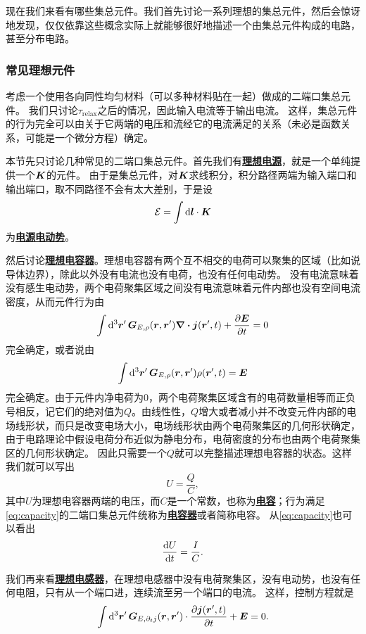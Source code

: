 \documentclass[UTF8, a4paper]{ctexart}
\newcommand*{\concept}[1]{\underline{\textbf{#1}}}
\begin{document}
现在我们来看有哪些集总元件。我们首先讨论一系列理想的集总元件，然后会惊讶地发现，仅仅依靠这些概念实际上就能够很好地描述一个由集总元件构成的电路，甚至分布电路。

\subsubsection{常见理想元件}


考虑一个使用各向同性均匀材料（可以多种材料贴在一起）做成的二端口集总元件。
我们只讨论$\tau_\text{relax}$之后的情况，因此输入电流等于输出电流。
这样，集总元件的行为完全可以由关于它两端的电压和流经它的电流满足的关系（未必是函数关系，可能是一个微分方程）确定。

本节先只讨论几种常见的二端口集总元件。首先我们有\concept{理想电源}，就是一个单纯提供一个$\vb*{K}$的元件。
由于是集总元件，对$\vb*{K}$求线积分，积分路径两端为输入端口和输出端口，取不同路径不会有太大差别，于是设
\begin{equation}
    \mathcal{E} = \int \dd{\vb*{l}} \cdot \vb*{K}
\end{equation}
为\concept{电源电动势}。

然后讨论\concept{理想电容器}。理想电容器有两个互不相交的电荷可以聚集的区域（比如说导体边界），除此以外没有电流也没有电荷，也没有任何电动势。
没有电流意味着没有感生电动势，两个电荷聚集区域之间没有电流意味着元件内部也没有空间电流密度，从而元件行为由
\[
    \int \dd[3]{\vb*{r}'} \vb*{G}_{E, \rho}(\vb*{r}, \vb*{r}') \div{\vb*{j}}(\vb*{r}', t) + \pdv{\vb*{E}}{t} = 0
\]
完全确定，或者说由
\[
    \int \dd[3]{\vb*{r}'} \vb*{G}_{E, \rho}(\vb*{r}, \vb*{r}') \rho(\vb*{r}', t) = \vb*{E}
\]
完全确定。由于元件内净电荷为0，两个电荷聚集区域含有的电荷数量相等而正负号相反，记它们的绝对值为$Q$。由线性性，$Q$增大或者减小并不改变元件内部的电场线形状，而只是改变电场大小，电场线形状由两个电荷聚集区的几何形状确定，由于电路理论中假设电荷分布近似为静电分布，电荷密度的分布也由两个电荷聚集区的几何形状确定。
因此只需要一个$Q$就可以完整描述理想电容器的状态。这样我们就可以写出
\begin{equation}
    U = \frac{Q}{C},
    \label{eq:capacity}
\end{equation}
其中$U$为理想电容器两端的电压，而$C$是一个常数，也称为\concept{电容}；行为满足\eqref{eq:capacity}的二端口集总元件统称为\concept{电容器}或者简称电容。
从\eqref{eq:capacity}也可以看出
\[
    \dv{U}{t} = \frac{I}{C}.
\]

我们再来看\concept{理想电感器}，在理想电感器中没有电荷聚集区，没有电动势，也没有任何电阻，只有从一个端口进，连续流至另一个端口的电流。
这样，控制方程就是
\[
    \int \dd[3]{\vb*{r}'} \vb*{G}_{E, \partial_t j}(\vb*{r}, \vb*{r}') \cdot \pdv{\vb*{j}(\vb*{r}', t)}{t} + \vb*{E} = 0.
\]
\end{document}
